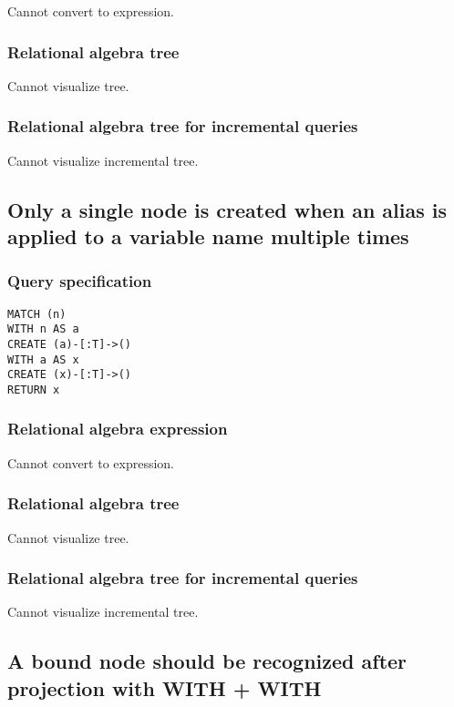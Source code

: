 Cannot convert to expression.

\subsubsection*{Relational algebra tree}

Cannot visualize tree.

\subsubsection*{Relational algebra tree for incremental queries}

Cannot visualize incremental tree.

\subsection{Only a single node is created when an alias is applied to a variable name multiple times}

\subsubsection*{Query specification}

\begin{lstlisting}
MATCH (n)
WITH n AS a
CREATE (a)-[:T]->()
WITH a AS x
CREATE (x)-[:T]->()
RETURN x
\end{lstlisting}

\subsubsection*{Relational algebra expression}

Cannot convert to expression.

\subsubsection*{Relational algebra tree}

Cannot visualize tree.

\subsubsection*{Relational algebra tree for incremental queries}

Cannot visualize incremental tree.

\subsection{A bound node should be recognized after projection with WITH + WITH}

